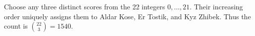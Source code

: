 Choose any three distinct scores from the 22 integers $0,\ldots,21$. Their increasing order uniquely assigns them to Aldar Kose, Er Tostik, and Kyz Zhibek. Thus the count is $\binom{22}{3}=\boxed{1540}$.
